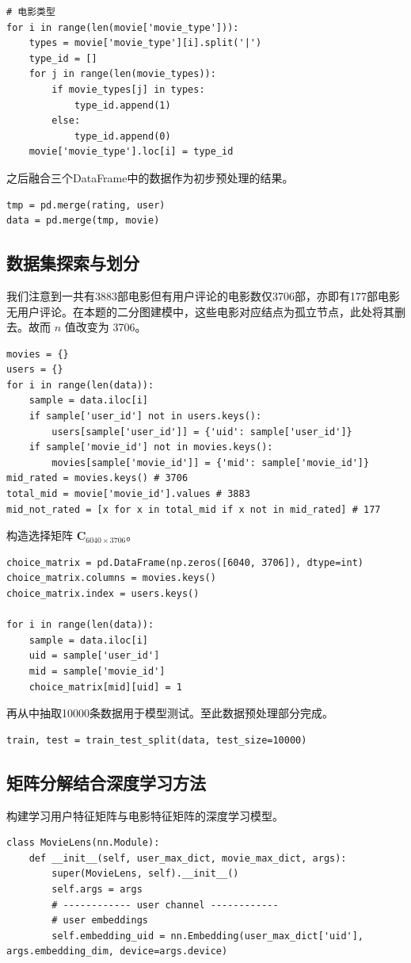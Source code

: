 \begin{spacing}{1.5}
\begin{lstlisting}
# 电影类型
for i in range(len(movie['movie_type'])):
    types = movie['movie_type'][i].split('|')
    type_id = []
    for j in range(len(movie_types)):
        if movie_types[j] in types:
            type_id.append(1)
        else:
            type_id.append(0)
    movie['movie_type'].loc[i] = type_id
\end{lstlisting}\par
之后融合三个DataFrame中的数据作为初步预处理的结果。
\begin{lstlisting}
tmp = pd.merge(rating, user)
data = pd.merge(tmp, movie)
\end{lstlisting}
\par
\subsection{数据集探索与划分}
我们注意到一共有3883部电影但有用户评论的电影数仅3706部，亦即有177部电影无用户评论。在本题的二分图建模中，这些电影对应结点为孤立节点，此处将其删去。故而 $n$ 值改变为 3706。
\begin{lstlisting}
movies = {}
users = {}
for i in range(len(data)):
    sample = data.iloc[i]
    if sample['user_id'] not in users.keys():
        users[sample['user_id']] = {'uid': sample['user_id']}
    if sample['movie_id'] not in movies.keys():
        movies[sample['movie_id']] = {'mid': sample['movie_id']}
mid_rated = movies.keys() # 3706
total_mid = movie['movie_id'].values # 3883
mid_not_rated = [x for x in total_mid if x not in mid_rated] # 177
\end{lstlisting}\par
构造选择矩阵 $\mathbf{C}_{6040 \times 3706}$。
\begin{lstlisting}
choice_matrix = pd.DataFrame(np.zeros([6040, 3706]), dtype=int)
choice_matrix.columns = movies.keys()
choice_matrix.index = users.keys()

for i in range(len(data)):
    sample = data.iloc[i]
    uid = sample['user_id']
    mid = sample['movie_id']
    choice_matrix[mid][uid] = 1
\end{lstlisting}\par
再从中抽取10000条数据用于模型测试。至此数据预处理部分完成。
\begin{lstlisting}
train, test = train_test_split(data, test_size=10000)
\end{lstlisting}\par

\subsection{矩阵分解结合深度学习方法}
\par
构建学习用户特征矩阵与电影特征矩阵的深度学习模型。
\begin{lstlisting}
class MovieLens(nn.Module):
    def __init__(self, user_max_dict, movie_max_dict, args):
        super(MovieLens, self).__init__()
        self.args = args
        # ------------ user channel ------------
        # user embeddings
        self.embedding_uid = nn.Embedding(user_max_dict['uid'], args.embedding_dim, device=args.device)
        

\end{lstlisting}
\end{spacing}
